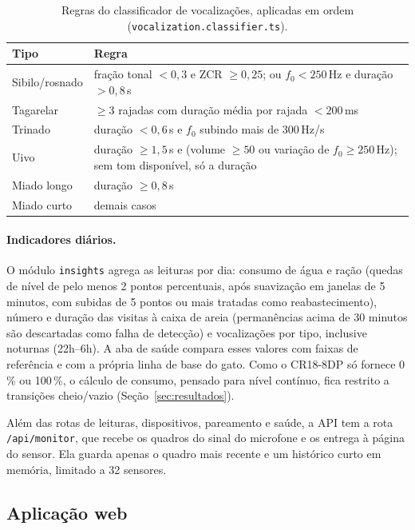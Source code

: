 \begin{table}[!ht]
\caption{Regras do classificador de vocalizações, aplicadas em ordem (\texttt{vocalization.classifier.ts}).}
\label{tab:classificador}
\centering
\small
\begin{tabularx}{\linewidth}{>{\hsize=0.621\hsize\raggedright\arraybackslash}X>{\hsize=1.379\hsize\raggedright\arraybackslash}X}
\toprule
\textbf{Tipo} & \textbf{Regra} \\
\midrule
Sibilo/rosnado & fração tonal $< 0{,}3$ e ZCR $\geq 0{,}25$; ou $f_0 < 250$\,Hz e duração $> 0{,}8$\,s \\
Tagarelar & $\geq 3$ rajadas com duração média por rajada $< 200$\,ms \\
Trinado & duração $< 0{,}6$\,s e $f_0$ subindo mais de 300\,Hz/s \\
Uivo & duração $\geq 1{,}5$\,s e (volume $\geq 50$ ou variação de $f_0 \geq 250$\,Hz); sem tom disponível, só a duração \\
Miado longo & duração $\geq 0{,}8$\,s \\
Miado curto & demais casos \\
\bottomrule
\end{tabularx}
\end{table}

\paragraph{Indicadores diários.}
O módulo \texttt{insights} agrega as leituras por dia: consumo de água e ração (quedas de nível de pelo menos 2 pontos percentuais, após suavização em janelas de 5 minutos, com subidas de 5 pontos ou mais tratadas como reabastecimento), número e duração das visitas à caixa de areia (permanências acima de 30 minutos são descartadas como falha de detecção) e vocalizações por tipo, inclusive noturnas (22h--6h). A aba de saúde compara esses valores com faixas de referência e com a própria linha de base do gato. Como o CR18-8DP só fornece 0\,\% ou 100\,\%, o cálculo de consumo, pensado para nível contínuo, fica restrito a transições cheio/vazio (Seção~\ref{sec:resultados}).

Além das rotas de leituras, dispositivos, pareamento e saúde, a API tem a rota \texttt{/api/monitor}, que recebe os quadros do sinal do microfone e os entrega à página do sensor. Ela guarda apenas o quadro mais recente e um histórico curto em memória, limitado a 32 sensores.

\subsection{Aplicação web}

